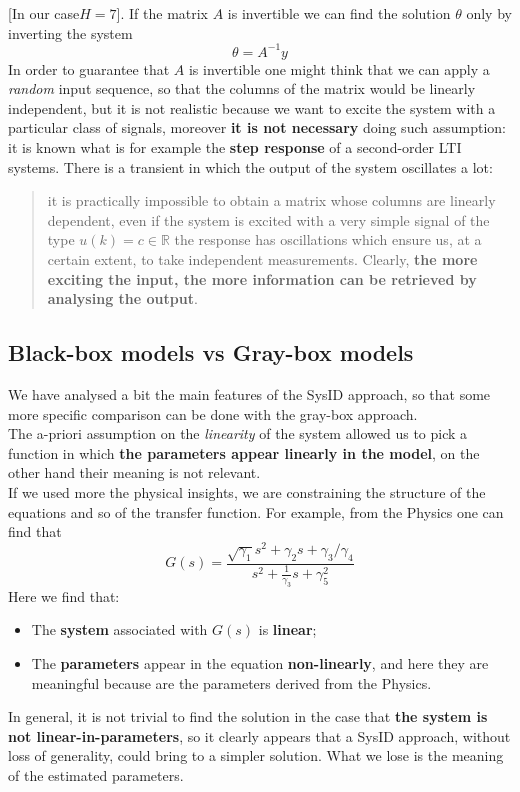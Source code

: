 [In our case$H=7$]. If the matrix $A$ is invertible we can find the solution $\theta$ only by inverting the system
\begin{equation} \label{eq: inversion}
    \theta = A^{-1}y
\end{equation}
In order to guarantee that $A$ is invertible one might think that we can apply a \textit{random} input sequence, so that the columns of the matrix would be linearly independent, but it is not realistic because we want to excite the system with a particular class of signals, moreover \textbf{it is not necessary} doing such assumption: it is known what is for example the \textbf{step response} of a second-order LTI systems. There is a transient in which the output of the system oscillates a lot: 
\begin{quote}
    it is practically impossible to obtain a matrix whose columns are linearly dependent, even if the system is excited with a very simple signal of the type $u(k)=c\in\mathbb{R}$ the response has oscillations which ensure us, at a certain extent, to take independent measurements. Clearly, \textbf{the more exciting the input, the more information can be retrieved by analysing the output}.
\end{quote}

\subsection{Black-box models vs Gray-box models}
We have analysed a bit the main features of the SysID approach, so that some more specific comparison can be done with the gray-box approach.\\
The a-priori assumption on the \textit{linearity} of the system allowed us to pick a function in which \textbf{the parameters appear linearly in the model}, on the other hand their meaning is not relevant.\\
If we used more the physical insights, we are constraining the structure of the equations and so of the transfer function. For example, from the Physics one can  find that
\begin{equation*}
    G(s)=\frac{
        \sqrt{\gamma_1}s^2+\gamma_2s+\gamma_3/\gamma_4
    }{
        s^2+\frac{1}{\gamma_3}s+\gamma_5^2
    }
\end{equation*} 
Here we find that:
\begin{itemize}
    \item The \textbf{system} associated with $G(s)$ is \textbf{linear}; 
    \item The \textbf{parameters} appear in the equation \textbf{non-linearly}, and here they are meaningful because are the parameters derived from the Physics.
\end{itemize}
In general, it  is not trivial to find the solution in the case that \textbf{the system is not linear-in-parameters}, so it clearly appears that a SysID approach, without loss of generality, could bring to a simpler solution. What we lose is the meaning of the estimated parameters.

